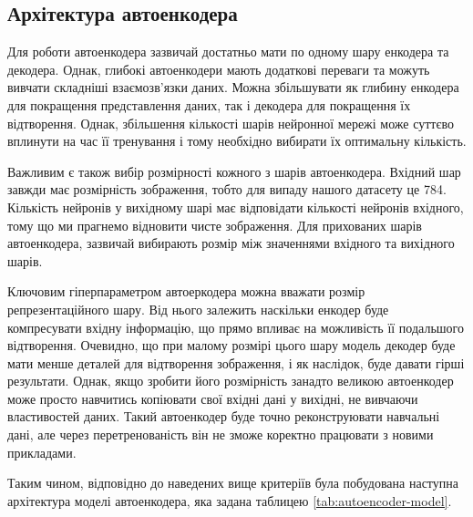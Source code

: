 \documentclass[14pt,a4paper]{extarticle}
\newcounter{e}
\numberwithin{equation}{section}
\numberwithin{figure}{section}
\begin{document}
	\subsection{Архітектура автоенкодера}	
	
	Для роботи автоенкодера зазвичай достатньо мати по одному шару енкодера та декодера. Однак, глибокі автоенкодери мають додаткові переваги та можуть вивчати складніші взаємозв'язки даних. Можна збільшувати як глибину енкодера для покращення представлення даних, так і декодера для покращення їх відтворення. Однак, збільшення кількості шарів нейронної мережі може суттєво вплинути на час її тренування і тому необхідно вибирати їх оптимальну кількість.
	
	Важливим є також вибір розмірності кожного з шарів автоенкодера. Вхідний шар завжди має розмірність зображення, тобто для випаду нашого датасету це 784. Кількість нейронів у вихідному шарі має відповідати кількості нейронів вхідного, тому що ми прагнемо відновити чисте зображення. Для прихованих шарів автоенкодера, зазвичай вибирають розмір між значеннями вхідного та вихідного шарів. 
	
	Ключовим гіперпараметром автоеркодера можна вважати розмір репрезентаційного шару. Від нього залежить наскільки енкодер буде компресувати вхідну інформацію, що прямо впливає на можливість її подальшого відтворення. Очевидно, що при малому розмірі цього шару модель декодер буде мати менше деталей для відтворення зображення, і як наслідок, буде давати гірші результати.  Однак, якщо зробити його розмірність занадто великою автоенкодер може просто навчитись копіювати свої вхідні дані у вихідні, не вивчаючи властивостей даних. Такий автоенкодер буде точно реконструювати навчальні дані, але через перетренованість він не зможе коректно працювати з новими прикладами.
	
	Таким чином, відповідно до наведених вище критеріїв була побудована наступна архітектура моделі автоенкодера, яка задана таблицею \ref{tab:autoencoder-model}.
	
\end{document}
